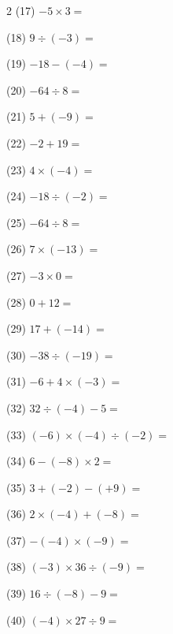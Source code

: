 \documentclass[a4paper, 11pt]{ltjsarticle}
\begin{document}
\begin{multicols*}{2}
\noindent (17) \quad $-5\times3 =$
\vspace*{\fill}

\noindent (18) \quad $9\div(-3) =$
\vspace*{\fill}

\noindent (19) \quad $-18-(-4) =$
\vspace*{\fill}

\noindent (20) \quad $-64\div8 =$
\vspace*{\fill}
\columnbreak

\noindent (21) \quad $5+(-9) =$
\vspace*{\fill}

\noindent (22) \quad $-2+19 =$
\vspace*{\fill}

\noindent (23) \quad $4\times(-4) =$
\vspace*{\fill}

\noindent (24) \quad $-18\div(-2) =$
\vspace*{\fill}

\noindent (25) \quad $-64\div8 =$
\vspace*{\fill}

\noindent (26) \quad $7\times(-13) =$
\vspace*{\fill}

\noindent (27) \quad $-3\times0 =$
\vspace*{\fill}

\noindent (28) \quad $0+12 =$
\vspace*{\fill}

\noindent (29) \quad $17+(-14) =$
\vspace*{\fill}

\noindent (30) \quad $-38\div(-19) =$
\vspace*{\fill}
\columnbreak

\noindent (31) \quad $-6+4\times(-3) =$
\vspace*{\fill}

\noindent (32) \quad $32\div(-4)-5 =$
\vspace*{\fill}

\noindent (33) \quad $(-6)\times(-4)\div(-2) =$
\vspace*{\fill}

\noindent (34) \quad $6-(-8)\times2 =$
\vspace*{\fill}

\noindent (35) \quad $3+(-2)-(+9) =$
\vspace*{\fill}

\noindent (36) \quad $2\times(-4)+(-8) =$
\vspace*{\fill}

\noindent (37) \quad $-(-4)\times(-9) =$
\vspace*{\fill}

\noindent (38) \quad $(-3)\times36\div(-9) =$
\vspace*{\fill}

\noindent (39) \quad $16\div(-8)-9 =$
\vspace*{\fill}

\noindent (40) \quad $(-4)\times27\div9 =$
\vspace*{\fill}

\end{multicols*}
\end{document}
